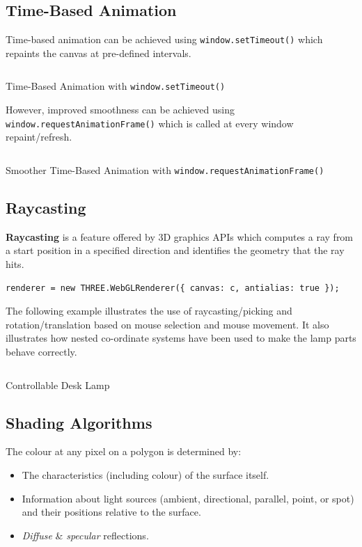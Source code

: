 \documentclass[a4paper,11pt]{article}
\newenvironment{code}{\captionsetup{type=listing}}{}
\begin{document}
\subsection{Time-Based Animation}
Time-based animation can be achieved using \texttt{window.setTimeout()} which repaints the 
canvas at pre-defined intervals.

\begin{code}
    \inputminted[linenos, breaklines, frame=single]{html}{../materials/week3/examples/canvasAnimationExample1.html}
    \caption{Time-Based Animation with \texttt{window.setTimeout()}}
\end{code}

However, improved smoothness can be achieved using \texttt{window.requestAnimationFrame()} which is called at
every window repaint/refresh.

\begin{code}
    \inputminted[linenos, breaklines, frame=single]{html}{../materials/week3/examples/canvasAnimationExample1_withSmootherAnimation.html}
    \caption{Smoother Time-Based Animation with \texttt{window.requestAnimationFrame()}}
\end{code}

\subsection{Raycasting}
\textbf{Raycasting} is a feature offered by 3D graphics APIs which computes a ray from a start position in a specified direction
and identifies the geometry that the ray hits.
\begin{verbatim}
renderer = new THREE.WebGLRenderer({ canvas: c, antialias: true });
\end{verbatim}

The following example illustrates the use of raycasting/picking and rotation/translation based on mouse selection and mouse 
movement.
It also illustrates how nested co-ordinate systems have been used to make the lamp parts behave correctly.

\begin{code}
    \inputminted[linenos, breaklines, frame=single]{html}{../materials/week3/examples/Threejs-20-controllable-desk-lamp.html}
    \caption{Controllable Desk Lamp}
\end{code}

\subsection{Shading Algorithms}
The colour at any pixel on a polygon is determined by:
\begin{itemize}
    \item   The characteristics (including colour) of the surface itself.
    \item   Information about light sources (ambient, directional, parallel, point, or spot) and their positions relative to
            the surface.
    \item   \textit{Diffuse} \& \textit{specular} reflections.
\end{itemize}
\end{document}

